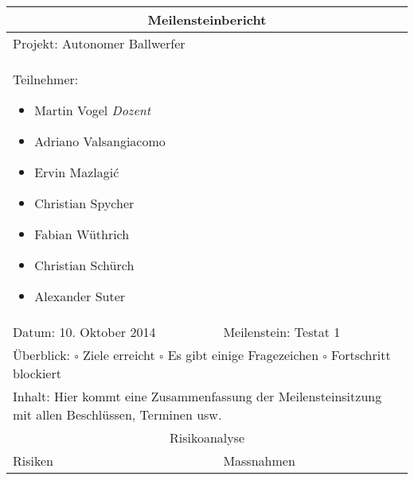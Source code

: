\begin{table}[!h]
	\renewcommand{\arraystretch}{1.5}
	\begin{tabularx}{\textwidth}{|X|X|}
		\hline
		\multicolumn{2}{|c|}{
			\parbox[0pt][3em][c]{0cm}{}
			{\large \textbf{Meilensteinbericht}}
		} \\
		\hline
		\multicolumn{2}{|l|}{Projekt: Autonomer Ballwerfer} \\
		\hline
		\multicolumn{2}{|p{0.95\textwidth}|}{
			Teilnehmer:
			\begin{itemize}
				\setlength\itemsep{0em}
				\item Martin Vogel \textit{Dozent}
				\item Adriano Valsangiacomo
				\item Ervin Mazlagi\'c
				\item Christian Spycher
				\item Fabian Wüthrich
				\item Christian Schürch
				\item Alexander Suter
			\end{itemize}
		} \\
		\hline
		Datum: 10. Oktober 2014 & Meilenstein: Testat 1 \\
		\hline
		\multicolumn{2}{|p{0.95\textwidth}|}{
			Überblick: \newline
			$\square$ Ziele erreicht \newline 
			$\square$ Es gibt einige Fragezeichen \newline
			$\square$ Fortschritt blockiert
		} \\
		\hline
		\multicolumn{2}{|p{0.95\textwidth}|}{
			Inhalt: \newline
			Hier kommt eine Zusammenfassung der Meilensteinsitzung mit allen Beschlüssen, Terminen usw.	
		} \\
		\hline
		\multicolumn{2}{|c|}{Risikoanalyse} \\
		\hline
		Risiken & Massnahmen \\
		\hline
	\end{tabularx}
\end{table}
